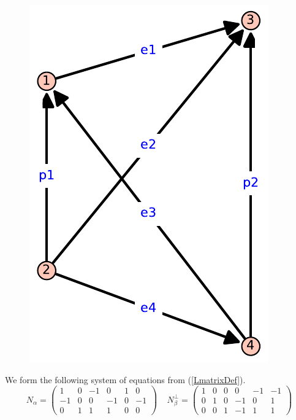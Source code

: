 \begin{figure}
  \includegraphics[scale=0.5]{K4.pdf}
\end{figure}


We form the following system of equations from (\ref{LmatrixDef}).
\[
N_\alpha=
\left(\begin{array}{cc|cccc}
1 & 0 & -1 & 0 & 1 & 0 \\
-1 & 0 & 0 & -1 & 0 & -1 \\
0 & 1 & 1 & 1 & 0 & 0
\end{array}\right)
\;\;\;\;
N_\beta^\perp =
\left(\begin{array}{cc|cccc}
1 & 0 & 0 & 0 & -1 & -1 \\
0 & 1 & 0 & -1 & 0 & 1 \\
0 & 0 & 1 & -1 & 1 & 1
\end{array}\right)
\]



